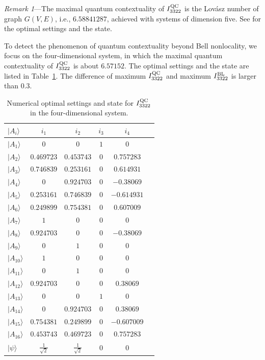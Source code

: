 \documentclass[prl,letterpaper,english,reprint,nofootinbib,aps,superscriptaddress,showpacs,showkeys]{revtex4-1}
\theoremstyle{definition}
\theoremstyle{remark}
\begin{document}
\emph{Remark 1}---The maximal quantum contextuality of  $I_{3322}^{\rm QC}$  is the Lov\'asz number of graph $G(V,E)$, i.e., $6.58841287$, achieved with systems of dimension five. See \cite{SM} for the optimal settings and the state.


To detect the phenomenon of quantum contextuality beyond Bell nonlocality, we focus on 
 the four-dimensional system, in which the maximal quantum contextuality of $I_{3322}^{\rm QC}$ is about $6.57152.$ The optimal settings and the state are listed in Table~\ref{numerica3}. The difference of maximum  $I_{3322}^{\rm QC}$ and maximum $I_{3322}^{\rm BL}$ is larger than $0.3$.

\begin{table}[htbp]
\centering
  \begin{tabular}{lccccc} \hline \hline
$|A_i\rangle$ & $i_1$ & $i_2$ & $i_3$ & $i_4$  \\
\hline
$|A_1\rangle$ & $0$ & $0$ & $1$ & $0$  \\
$|A_2\rangle$  & $0.469723$ & $0.453743$ & $0$ & $0.757283$  \\
$|A_3\rangle$ & $0.746839$ & $0.253161$ & $0$ & $0.614931$  \\
$|A_4\rangle$  & $0$ & $0.924703$ & $0$ & $-0.38069$  \\
$|A_5\rangle$ & $0.253161$ & $0.746839$ & $0$ & $-0.614931$  \\
$|A_6\rangle$ & $0.249899$ & $0.754381$ & $0$ & $0.607009$  \\
$|A_7\rangle$ & $1$ & $0$ & $0$ & $0$  \\
$|A_8\rangle$  & $0.924703$ & $0$ & $0$ & $-0.38069$  \\
$|A_9\rangle$  & $0$ & $1$ & $0$ & $0$  \\
$|A_{10}\rangle$  & $1$ & $0$ & $0$ & $0$ \\
$|A_{11}\rangle$ & $0$ & $1$ & $0$ & $0$  \\
$|A_{12}\rangle$  & $0.924703$ & $0$ & $0$ & $0.38069$  \\
$|A_{13}\rangle$  & $0$ & $0$ & $1$ & $0$  \\
$|A_{14}\rangle$  & $0$ & $0.924703$ & $0$ & $0.38069$  \\
$|A_{15}\rangle$ & $0.754381$ & $0.249899$ & $0$ & $-0.607009$  \\
$|A_{16}\rangle$  & $0.453743$ & $0.469723$ & $0$ & $0.757283$  \\
\hline
$|\psi\rangle$ & $\frac{1}{\sqrt{2}}$ & $\frac{1}{\sqrt{2}}$ & $0$ & $0$\\
  \hline \hline
   \end{tabular}
\caption{Numerical optimal settings and state for $I_{3322}^{\rm QC}$  in the four-dimensional system.}
\label{numerica3}
\end{table}
\end{document}

